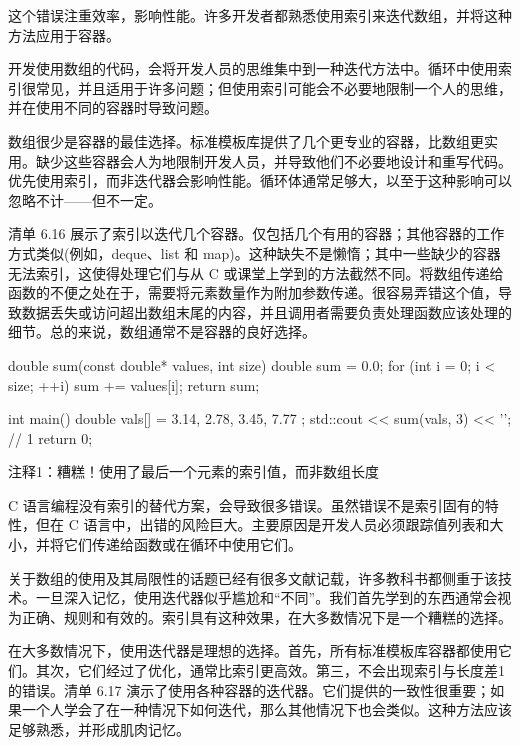 这个错误注重效率，影响性能。许多开发者都熟悉使用索引来迭代数组，并将这种方法应用于容器。


开发使用数组的代码，会将开发人员的思维集中到一种迭代方法中。循环中使用索引很常见，并且适用于许多问题；但使用索引可能会不必要地限制一个人的思维，并在使用不同的容器时导致问题。

数组很少是容器的最佳选择。标准模板库提供了几个更专业的容器，比数组更实用。缺少这些容器会人为地限制开发人员，并导致他们不必要地设计和重写代码。优先使用索引，而非迭代器会影响性能。循环体通常足够大，以至于这种影响可以忽略不计——但不一定。

清单 6.16 展示了索引以迭代几个容器。仅包括几个有用的容器；其他容器的工作方式类似(例如，deque、list 和 map)。这种缺失不是懒惰；其中一些缺少的容器无法索引，这使得处理它们与从 C 或课堂上学到的方法截然不同。将数组传递给函数的不便之处在于，需要将元素数量作为附加参数传递。很容易弄错这个值，导致数据丢失或访问超出数组末尾的内容，并且调用者需要负责处理函数应该处理的细节。总的来说，数组通常不是容器的良好选择。


\begin{cpp}
double sum(const double* values, int size) {
  double sum = 0.0;
  for (int i = 0; i < size; ++i)
    sum += values[i];
  return sum;
}

int main() {
  double vals[] = { 3.14, 2.78, 3.45, 7.77 };
  std::cout << sum(vals, 3) << '\n'; // 1
  return 0;
}
\end{cpp}

{\footnotesize
注释1：糟糕！使用了最后一个元素的索引值，而非数组长度
}


C 语言编程没有索引的替代方案，会导致很多错误。虽然错误不是索引固有的特性，但在 C 语言中，出错的风险巨大。主要原因是开发人员必须跟踪值列表和大小，并将它们传递给函数或在循环中使用它们。

关于数组的使用及其局限性的话题已经有很多文献记载，许多教科书都侧重于该技术。一旦深入记忆，使用迭代器似乎尴尬和“不同”。我们首先学到的东西通常会视为正确、规则和有效的。索引具有这种效果，在大多数情况下是一个糟糕的选择。


在大多数情况下，使用迭代器是理想的选择。首先，所有标准模板库容器都使用它们。其次，它们经过了优化，通常比索引更高效。第三，不会出现索引与长度差1的错误。清单 6.17 演示了使用各种容器的迭代器。它们提供的一致性很重要；如果一个人学会了在一种情况下如何迭代，那么其他情况下也会类似。这种方法应该足够熟悉，并形成肌肉记忆。

